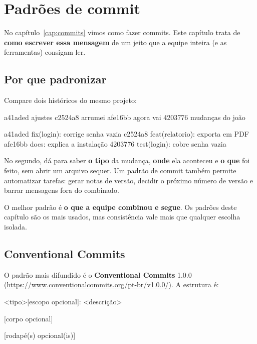 \chapter{Padrões de commit}
\label{cap:padroes}

No capítulo~\ref{cap:commits} vimos como fazer commits. Este capítulo trata de \textbf{como escrever essa mensagem} de um jeito que a equipe inteira (e as ferramentas) consigam ler.

\section{Por que padronizar}

Compare dois históricos do mesmo projeto:

\begin{saida}
a41aded ajustes
c2524a8 arrumei
afe16bb agora vai
4203776 mudanças do joão
\end{saida}
\begin{saida}
a41aded fix(login): corrige senha vazia
c2524a8 feat(relatorio): exporta em PDF
afe16bb docs: explica a instalação
4203776 test(login): cobre senha vazia
\end{saida}

No segundo, dá para saber \textbf{o tipo} da mudança, \textbf{onde} ela aconteceu e \textbf{o que} foi feito, sem abrir um arquivo sequer. Um padrão de commit também permite automatizar tarefas: gerar notas de versão, decidir o próximo número de versão e barrar mensagens fora do combinado.

\begin{conceito}
O melhor padrão é \textbf{o que a equipe combinou e segue}. Os padrões deste capítulo são os mais usados, mas consistência vale mais que qualquer escolha isolada.
\end{conceito}

\section{Conventional Commits}

O padrão mais difundido é o \textbf{Conventional Commits} 1.0.0 (\url{https://www.conventionalcommits.org/pt-br/v1.0.0/}). A estrutura é:

\begin{bashcode}
<tipo>[escopo opcional]: <descrição>

[corpo opcional]

[rodapé(s) opcional(is)]
\end{bashcode}

